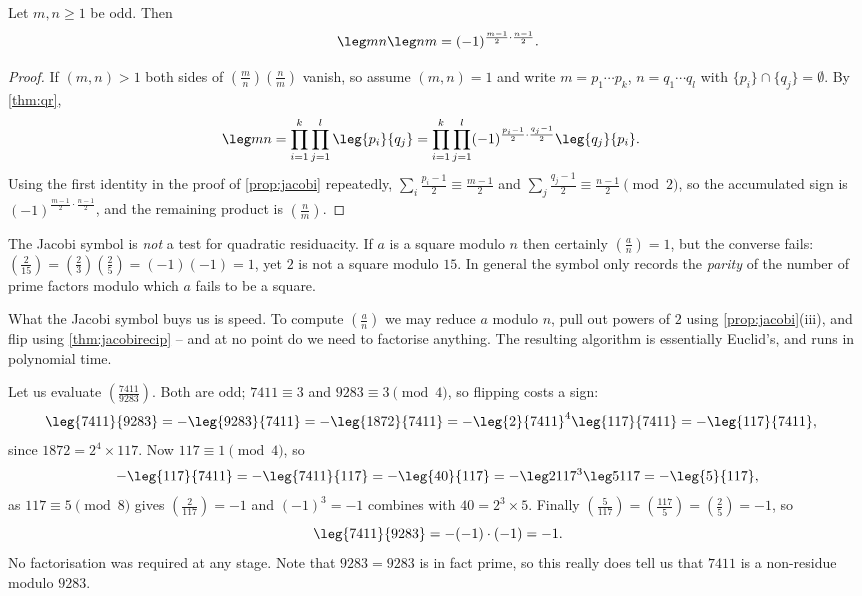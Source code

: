 \begin{theorem}\label{thm:jacobirecip}
	Let $m, n \geq 1$ be odd. Then
	$$
	\leg mn \leg nm = (-1)^{\frac{m-1}2\cdot\frac{n-1}2}.
	$$
\end{theorem}
\begin{proof}
	If $(m, n) > 1$ both sides of $\left( \frac mn \right)\left( \frac nm \right)$ vanish, so assume $(m,n) = 1$ and write $m = p_1 \cdots p_k$, $n = q_1 \cdots q_l$ with $\{p_i\} \cap \{q_j\} = \emptyset$. By \autoref{thm:qr},
	\begin{align*}
		\leg mn &= \prod_{i=1}^k \prod_{j=1}^l \leg{p_i}{q_j} = \prod_{i=1}^k\prod_{j=1}^l (-1)^{\frac{p_i - 1}2 \cdot \frac{q_j - 1}2}\leg{q_j}{p_i}.
	\end{align*}
	Using the first identity in the proof of \autoref{prop:jacobi} repeatedly, $\sum_i \frac{p_i - 1}{2} \equiv \frac{m-1}{2}$ and $\sum_j \frac{q_j-1}2 \equiv \frac{n-1}2 \pmod 2$, so the accumulated sign is $(-1)^{\frac{m-1}2\cdot\frac{n-1}2}$, and the remaining product is $\left( \frac nm \right)$.
\end{proof}

\begin{remark}
	The Jacobi symbol is \emph{not} a test for quadratic residuacity. If $a$ is a square modulo $n$ then certainly $\left( \frac an \right) = 1$, but the converse fails: $\left( \frac2{15} \right) = \left( \frac23 \right)\left( \frac25 \right) = (-1)(-1) = 1$, yet $2$ is not a square modulo $15$. In general the symbol only records the \emph{parity} of the number of prime factors modulo which $a$ fails to be a square.
\end{remark}

What the Jacobi symbol buys us is speed. To compute $\left( \frac an \right)$ we may reduce $a$ modulo $n$, pull out powers of $2$ using \autoref{prop:jacobi}(iii), and flip using \autoref{thm:jacobirecip} -- and at no point do we need to factorise anything. The resulting algorithm is essentially Euclid's, and runs in polynomial time.

\begin{example}
	Let us evaluate $\left( \frac{7411}{9283} \right)$. Both are odd; $7411 \equiv 3$ and $9283 \equiv 3 \pmod 4$, so flipping costs a sign:
	\begin{align*}
		\leg{7411}{9283} &= -\leg{9283}{7411} = -\leg{1872}{7411} = -\leg{2}{7411}^4\leg{117}{7411} = -\leg{117}{7411},
	\end{align*}
	since $1872 = 2^4 \times 117$. Now $117 \equiv 1 \pmod 4$, so
	$$
	-\leg{117}{7411} = -\leg{7411}{117} = -\leg{40}{117} = -\leg 2{117}^3 \leg 5{117} = -\leg{5}{117},
	$$
	as $117 \equiv 5 \pmod 8$ gives $\left( \frac2{117} \right) = -1$ and $(-1)^3 = -1$ combines with $40 = 2^3 \times 5$. Finally $\left( \frac 5{117} \right) = \left( \frac{117}5 \right) = \left( \frac 25 \right) = -1$, so
	$$
	\leg{7411}{9283} = -(-1)\cdot(-1) = -1.
	$$
	No factorisation was required at any stage. Note that $9283 = 9283$ is in fact prime, so this really does tell us that $7411$ is a non-residue modulo $9283$.
\end{example}

